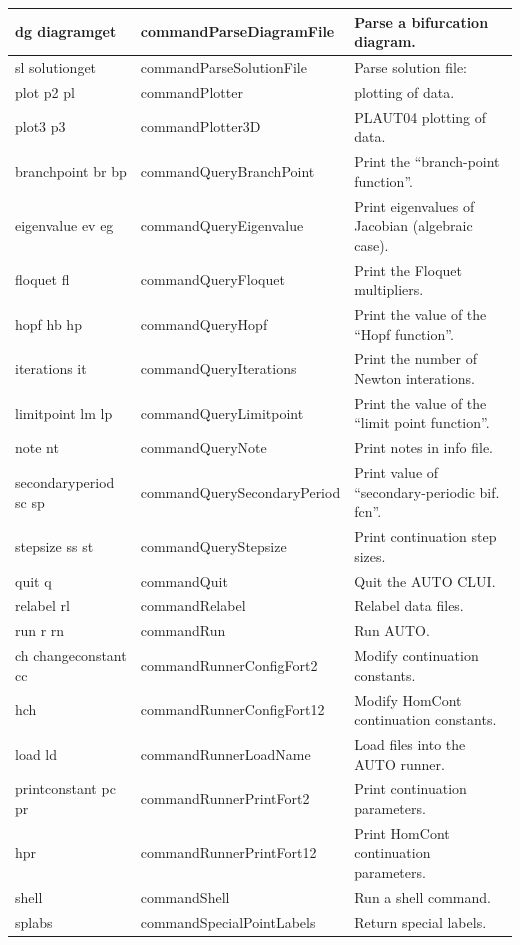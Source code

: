 \documentclass[12pt]{report}
\begin{document}
\begin{longtable}{|p{1.1in}|l|p{2.5in}|}
dg diagramget & commandParseDiagramFile & Parse a bifurcation diagram.\\ \hline 
sl solutionget & commandParseSolutionFile & Parse solution file:\\ \hline 
plot p2 pl & commandPlotter & plotting of data.\\ \hline 
plot3 p3 & commandPlotter3D & PLAUT04 plotting of data.\\ \hline 
branchpoint br bp & commandQueryBranchPoint & Print the ``branch-point function''.\\ \hline 
eigenvalue ev eg & commandQueryEigenvalue & Print eigenvalues of Jacobian (algebraic case).\\ \hline 
floquet fl & commandQueryFloquet & Print the Floquet multipliers.\\ \hline 
hopf hb hp & commandQueryHopf & Print the value of the ``Hopf function''.\\ \hline 
iterations it & commandQueryIterations & Print the number of Newton interations.\\ \hline 
limitpoint lm lp & commandQueryLimitpoint & Print the value of the ``limit point function''.\\ \hline 
note nt & commandQueryNote & Print notes in info file.\\ \hline 
secondaryperiod sc sp & commandQuerySecondaryPeriod & Print value of ``secondary-periodic bif. fcn''.\\ \hline 
stepsize ss st & commandQueryStepsize & Print continuation step sizes.\\ \hline 
quit q & commandQuit & Quit the AUTO CLUI.\\ \hline 
relabel rl & commandRelabel & Relabel data files.\\ \hline
run r rn & commandRun & Run AUTO.\\ \hline 
ch changeconstant cc & commandRunnerConfigFort2 & Modify continuation constants.\\ \hline 
hch & commandRunnerConfigFort12 & Modify HomCont continuation constants.\\ \hline 
load ld & commandRunnerLoadName & Load files into the AUTO runner.\\ \hline 
printconstant pc pr & commandRunnerPrintFort2 & Print continuation parameters.\\ \hline 
hpr & commandRunnerPrintFort12 & Print HomCont continuation parameters.\\ \hline 
shell & commandShell & Run a shell command.\\ \hline 
splabs & commandSpecialPointLabels & Return special labels.\\ \hline

\end{longtable}
\end{document}
